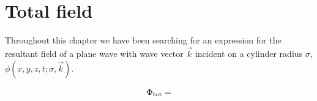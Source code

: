 \section{Total field}
Throughout this chapter we have been searching for an expression for the resultant field of a plane wave with wave vector $\vec{k}$ incident on a cylinder radius $\sigma$, $\phi(x,y,z,t;\sigma, \vec{k})$.\par
%
    \begin{propn}
        \begin{equation*}
            \Phi_{\text{tot}} =
        \end{equation*}
    \end{propn}
